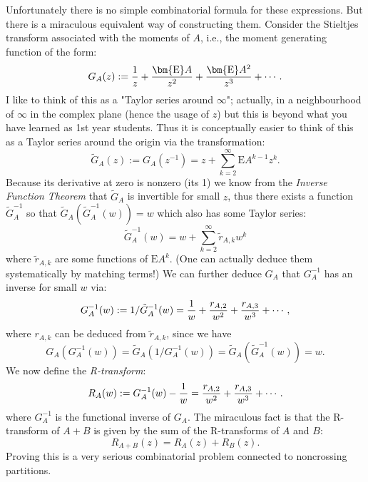 Unfortunately there is no simple combinatorial formula for these expressions. But there is a miraculous equivalent way of constructing them. Consider the Stieltjes transform associated with the moments of $A$, i.e., the moment generating function of the form:
\[
G_A(z) := {1 \over z} + {\ensuremath{\bm{\mathrm{E}}} A \over z^2} + {\ensuremath{\bm{\mathrm{E}}} A^2  \over z^3} + \ensuremath{\cdots}.
\]
I like to think of this as a "Taylor series around \ensuremath{\infty}"; actually, in a neighbourhood of \ensuremath{\infty} in the complex plane (hence the usage of $z$) but this is beyond what you have learned as 1st year students. Thus it is conceptually easier to think of this as a Taylor series around the origin via the transformation:
\[
\tilde{G}_A(z) := G_A(z^{-1}) = z + \ensuremath{\sum}_{k=2}^\ensuremath{\infty} \ensuremath{\bm{\mathrm{E}}} A^{k-1} z^k.
\]
Because its derivative at zero is nonzero (its 1) we know from the \emph{Inverse Function Theorem} that $\tilde{G}_A$ is invertible for small $z$, thus there exists a function $\tilde{G}_A^{-1}$ so that $\tilde{G}_A(\tilde{G}_A^{-1}(w)) = w$    which also has some Taylor series:
\[
\tilde{G}_A^{-1}(w) = w + \ensuremath{\sum}_{k=2}^\ensuremath{\infty} \tilde{r}_{A,k} w^k
\]
where $\tilde{r}_{A,k}$ are some functions of $\ensuremath{\bm{\mathrm{E}}} A^k$.  (One can actually deduce them systematically by matching terms!) We can further deduce $G_A$ that $G_A^{-1}$ has an inverse for small $w$ via:
\[
G_A^{-1}(w) := 1/\tilde{G}_A^{-1}(w) = {1 \over w} + {r_{A,2} \over w^2} + {r_{A,3} \over w^3} + \ensuremath{\cdots},
\]
where $r_{A,k}$ can be deduced from $\tilde{r}_{A,k}$, since we have 
\[
G_A(G_A^{-1}(w)) = \tilde{G}_A(1/G_A^{-1}(w)) = \tilde{G}_A(\tilde{G}_A^{-1}(w)) = w.
\]
We now define the \emph{R-transform}:
\[
R_A(w) := G_A^{-1}(w) - {1 \over w} = {r_{A,2} \over w^2} + {r_{A,3} \over w^3} + \ensuremath{\cdots}.
\]
where $G_A^{-1}$ is the functional inverse of $G_A$. The miraculous fact is that the R-transform of $A+B$ is given by the sum of the R-transforms of $A$ and $B$:
\[
R_{A+B}(z) = R_A(z) + R_B(z).
\]
Proving this is a very serious combinatorial problem connected to noncrossing partitions.

